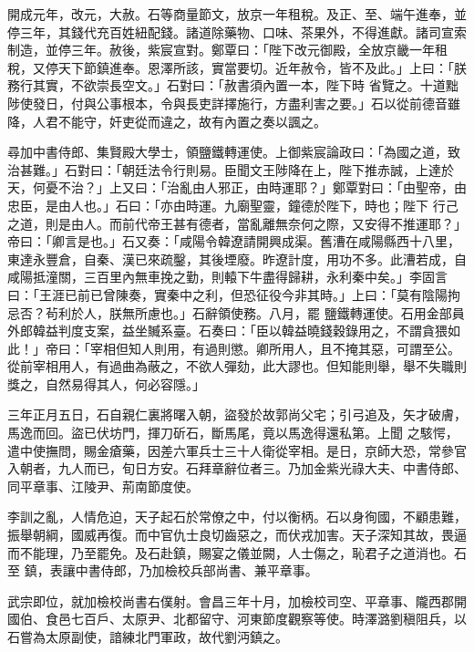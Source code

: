 \begin{pinyinscope}
 開成元年，改元，大赦。石等商量節文，放京一年租稅。及正、至、端午進奉，並停三年，其錢代充百姓紐配錢。諸道除藥物、口味、茶果外，不得進獻。諸司宣索制造，並停三年。赦後，紫宸宣對。鄭覃曰：「陛下改元御殿，全放京畿一年租稅，又停天下節鎮進奉。恩澤所該，實當要切。近年赦令，皆不及此。」上曰：「朕務行其實，不欲崇長空文。」石對曰：「赦書須內置一本，陛下時
 省覽之。十道黜陟使發日，付與公事根本，令與長吏詳擇施行，方盡利害之要。」石以從前德音雖降，人君不能守，奸吏從而違之，故有內置之奏以諷之。



 尋加中書侍郎、集賢殿大學士，領鹽鐵轉運使。上御紫宸論政曰：「為國之道，致治甚難。」石對曰：「朝廷法令行則易。臣聞文王陟降在上，陛下推赤誠，上達於天，何憂不治？」上又曰：「治亂由人邪正，由時運耶？」鄭覃對曰：「由聖帝，由忠臣，是由人也。」石曰：「亦由時運。九廟聖靈，鐘德於陛下，時也；陛下
 行己之道，則是由人。而前代帝王甚有德者，當亂離無奈何之際，又安得不推運耶？」帝曰：「卿言是也。」石又奏：「咸陽令韓遼請開興成渠。舊漕在咸陽縣西十八里，東達永豐倉，自秦、漢已來疏鑿，其後堙廢。昨遼計度，用功不多。此漕若成，自咸陽抵潼關，三百里內無車挽之勤，則轅下牛盡得歸耕，永利秦中矣。」李固言曰：「王涯已前已曾陳奏，實秦中之利，但恐征役今非其時。」上曰：「莫有陰陽拘忌否？茍利於人，朕無所慮也。」石辭領使務。八月，罷
 鹽鐵轉運使。石用金部員外郎韓益判度支案，益坐贓系臺。石奏曰：「臣以韓益曉錢穀錄用之，不謂貪猥如此！」帝曰：「宰相但知人則用，有過則懲。卿所用人，且不掩其惡，可謂至公。從前宰相用人，有過曲為蔽之，不欲人彈劾，此大謬也。但知能則舉，舉不失職則獎之，自然易得其人，何必容隱。」



 三年正月五日，石自親仁裏將曙入朝，盜發於故郭尚父宅；引弓追及，矢才破膚，馬逸而回。盜已伏坊門，揮刀斫石，斷馬尾，竟以馬逸得還私第。上聞
 之駭愕，遣中使撫問，賜金瘡藥，因差六軍兵士三十人衛從宰相。是日，京師大恐，常參官入朝者，九人而已，旬日方安。石拜章辭位者三。乃加金紫光祿大夫、中書侍郎、同平章事、江陵尹、荊南節度使。



 李訓之亂，人情危迫，天子起石於常僚之中，付以衡柄。石以身徇國，不顧患難，振舉朝綱，國威再復。而中官仇士良切齒惡之，而伏戎加害。天子深知其故，畏逼而不能理，乃至罷免。及石赴鎮，賜宴之儀並闕，人士傷之，恥君子之道消也。石至
 鎮，表讓中書侍郎，乃加檢校兵部尚書、兼平章事。



 武宗即位，就加檢校尚書右僕射。會昌三年十月，加檢校司空、平章事、隴西郡開國伯、食邑七百戶、太原尹、北都留守、河東節度觀察等使。時澤潞劉稹阻兵，以石嘗為太原副使，諳練北門軍政，故代劉沔鎮之。




\end{pinyinscope}
